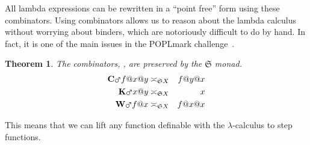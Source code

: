 \documentclass{elsarticle}
\makeatletter
\newcommand{\tmstrong}[1]{\textbf{#1}}
\newcommand{\tmtextup}[1]{{\upshape{#1}}}
\newtheorem{theorem}{Theorem}
\newcommand{\app}{@}
\newcommand{\Map}{\ensuremath{\mars}}
\newcommand{\SF}{\ensuremath{\mathfrak{S}}}
\newcommand{\flip}{\text{{\tmstrong{\tmtextup{C}}}}}
\newcommand{\const}{\text{{\tmstrong{\tmtextup{K}}}}}
\newcommand{\diag}{\text{{\tmstrong{\tmtextup{W}}}}}
\makeatother
\begin{document}
All lambda expressions can be rewritten in a ``point free'' form using these
combinators. Using combinators allows us to reason about the lambda calculus
without worrying about binders, which are notoriously difficult to do by hand.
In fact, it is one of the main issues in the POPLmark
challenge~{\cite{aydemir05mechanized}}.

\begin{theorem}
  The combinators, {\flip}{\const}{\diag}, are preserved by the
  {\SF} monad.
  \begin{eqnarray*}
    \flip  \Map f \app x \app y & \asymp_{\SF X} & f \app y \app x\\
    \const  \Map x \app y & \asymp_{\SF X} & x\\
    \diag  \Map f \app x & \asymp_{\SF X} & f \app x \app x
  \end{eqnarray*}
\end{theorem}

This means that we can lift any function definable with the $\lambda$-calculus
to step functions.
\end{document}
